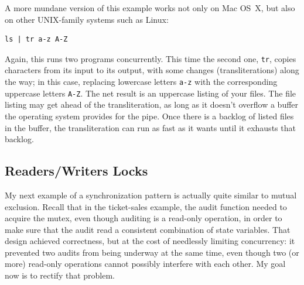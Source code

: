 A more mundane version of this
example works not only on Mac OS~X, but also on other UNIX-family
systems such as Linux:
\begin{verbatim}
ls | tr a-z A-Z
\end{verbatim}
Again, this runs two programs concurrently.  This time the second one, \verb|tr|, copies
characters from its input to its output, with some changes
(transliterations) along the way; in this case, replacing lowercase
letters \verb|a-z| with the corresponding uppercase letters \verb|A-Z|.  The net
result is an uppercase listing of your files.  The file listing may
get ahead of the transliteration, as long as it doesn't overflow a
buffer the operating system provides for the pipe.  Once there is a
backlog of listed files in the buffer, the transliteration can run as
fast as it wants until it exhausts that backlog.

\subsection{Readers/Writers Locks}\label{rw-section}

My next example of a synchronization pattern is actually quite
similar to mutual exclusion.  Recall that in the ticket-sales
example, the audit function needed to acquire the mutex, even though auditing
is a read-only operation, in order to make sure that the audit read a consistent
combination of state variables.  That design achieved correctness, but
at the cost of needlessly limiting concurrency: it prevented two
audits from being underway at the same time, even though two (or more)
read-only operations cannot possibly interfere with each other.
My goal now is to rectify that problem.

